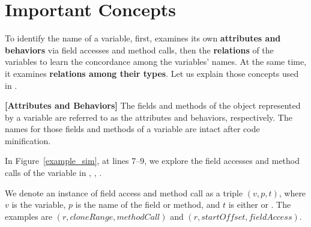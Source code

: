 \section{Important Concepts}
\label{sec:concepts}

To identify the name of a variable, first, {\tool} examines its own
{\bf attributes and behaviors} via field accesses and method calls,
then the {\bf relations} of the variables to learn the concordance
among the variables' names. At the same time, it examines {\bf
relations among their types}. Let us explain those concepts
used in {\tool}.


\begin{definition}{\bf [Attributes and Behaviors]}
  The fields and methods of the object represented by a variable are
  referred to as the attributes and behaviors, respectively. The names
  for those fields and methods of a variable are intact after code
  minification.
\end{definition}


In Figure~\ref{example_sim}, at lines 7--9, we explore the
field accesses and method calls of the variable  in
, , .

We denote an instance of field access and method call as a triple $(v,
p, t)$, where $v$ is the variable, $p$ is the name of the field or
method, and $t$ is either  or .
The examples are $(r, cloneRange, methodCall)$ and $(r,
startOffset, fieldAccess)$.


